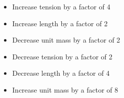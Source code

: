 \begin{itemize}
\item{} Increase tension by a factor of 4
\vskip 5pt 
\item{} Increase length by a factor of 2
\vskip 5pt 
\item{} Decrease unit mass by a factor of 2
\vskip 5pt 
\item{} Decrease tension by a factor of 2
\vskip 5pt 
\item{} Decrease length by a factor of 4
\vskip 5pt 
\item{} Increase unit mass by a factor of 8
\end{itemize}




